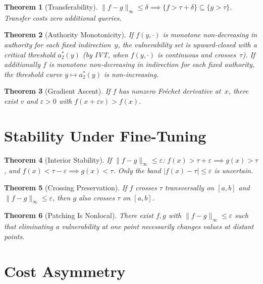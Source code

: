 \documentclass[11pt]{article}
\newtheorem{theorem}{Theorem}[section]
\begin{document}
\begin{theorem}[Transferability]
\label{thm:transfer}
$\|f-g\|_\infty \leq \delta \implies
\{f > \tau+\delta\} \subseteq \{g > \tau\}$.
Transfer costs zero additional queries.
\end{theorem}

\begin{theorem}[Authority Monotonicity]
\label{thm:authority}
If $f(y,\cdot)$ is monotone non-decreasing in authority for each fixed
indirection~$y$, the vulnerability set is upward-closed with a critical
threshold $a^*_2(y)$ (by IVT, when $f(y,\cdot)$ is continuous and
crosses~$\tau$). If additionally $f$ is monotone non-decreasing in
indirection for each fixed authority, the threshold curve
$y \mapsto a^*_2(y)$ is non-increasing.
\end{theorem}

\begin{theorem}[Gradient Ascent]
\label{thm:gradient}
If $f$ has nonzero Fr\'{e}chet derivative at~$x$, there exist $v$ and
$\varepsilon > 0$ with $f(x + \varepsilon v) > f(x)$.
\end{theorem}


\section{Stability Under Fine-Tuning}
\label{app:stability}

\begin{theorem}[Interior Stability]
\label{thm:interior-stable}
If $\|f - g\|_\infty \leq \varepsilon$:
$f(x) > \tau + \varepsilon \implies g(x) > \tau$, and
$f(x) < \tau - \varepsilon \implies g(x) < \tau$.
Only the band $|f(x) - \tau| \leq \varepsilon$ is uncertain.
\end{theorem}

\begin{theorem}[Crossing Preservation]
\label{thm:crossing}
If $f$ crosses $\tau$ transversally on $[a,b]$ and
$\|f - g\|_\infty \leq \varepsilon$, then $g$ also crosses $\tau$
on $[a,b]$.
\end{theorem}

\begin{theorem}[Patching Is Nonlocal]
\label{thm:nonlocal}
There exist $f, g$ with $\|f-g\|_\infty \leq \varepsilon$ such that
eliminating a vulnerability at one point necessarily changes values at
distant points.
\end{theorem}


\section{Cost Asymmetry}
\label{app:cost}
\end{document}
